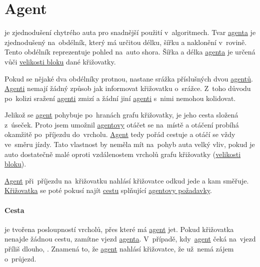 \section{Agent}\label{sec:agent}



 je zjednodušení chytrého auta pro snadnější použití v~algoritmech.
Tvar \hyperref[sec:agent]{agenta} je zjednodušený na~obdélník, který má určitou délku, šířku a naklonění v~rovině.
Tento obdélník reprezentuje pohled na~auto shora.
Šířka a délka \hyperref[sec:agent]{agenta} je určená vůči \hyperref[par:velikost_bloku]{velikosti bloku} dané křižovatky.

Pokud se nějaké dva obdélníky protnou, nastane srážka příslušných dvou \hyperref[sec:agent]{agentů}.
\hyperref[sec:agent]{Agenti} nemají žádný způsob jak informovat křižovatku o~srážce.
Z~toho důvodu po~kolizi sražení \hyperref[sec:agent]{agenti} zmizí a žádní jiní \hyperref[sec:agent]{agenti} s~nimi nemohou kolidovat.

Jelikož se \hyperref[sec:agent]{agent} pohybuje po~hranách grafu křižovatky, je jeho cesta složená z~úseček.
Proto jsem umožnil \hyperref[sec:agent]{agentovy} otáčet se na~místě a otáčení probíhá okamžitě po~příjezdu do~vrcholu.
\hyperref[sec:agent]{Agent} tedy pořád cestuje a otáčí se vždy ve~směru jízdy.
Tato vlastnost by neměla mít na~pohyb auta velký vliv, pokud je auto dostatečně malé
oproti vzdálenostem vrcholů grafu křižovatky (\hyperref[par:velikost_bloku]{velikosti bloku}).

\hyperref[sec:agent]{Agent} při~příjezdu na~křižovatku nahlásí křižovatce odkud jede a kam směřuje.
\hyperref[sec:krizovatka]{Křižovatka} se poté pokusí najít \hyperref[par:cesta]{cestu} splňující \hyperref[sec:agent]{agentovy požadavky}.

\paragraph{Cesta}\label{par:cesta} je tvořena posloupností vrcholů, přes které má \hyperref[sec:agent]{agent} jet.
Pokud křižovatka nenajde žádnou cestu, zamítne vjezd \hyperref[sec:agent]{agenta}.
V~případě, kdy~\hyperref[sec:agent]{agent} čeká na~vjezd příliš dlouho,
.
Znamená to, že \hyperref[sec:agent]{agent} nahlásí křižovatce, že už~nemá zájem o~průjezd.
